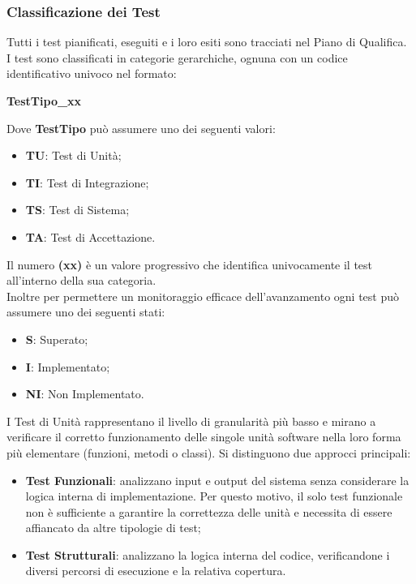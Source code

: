 \subsubsection{Classificazione dei Test}
Tutti i test pianificati, eseguiti e i loro esiti sono tracciati nel Piano di Qualifica.\\
I test sono classificati in categorie gerarchiche, ognuna con un codice identificativo univoco nel formato:
\begin{center}
    \textbf{TestTipo\_xx}
\end{center}
Dove \textbf{TestTipo} può assumere uno dei seguenti valori:
\begin{itemize}[itemsep=3pt, parsep=1pt, label=$\scriptstyle\bullet$]
    \item \textbf{TU}: Test di Unità;
    \item \textbf{TI}: Test di Integrazione;
    \item \textbf{TS}: Test di Sistema;
    \item \textbf{TA}: Test di Accettazione.
\end{itemize}
Il numero \textbf{(xx)} è un valore progressivo che identifica univocamente il test all'interno della sua categoria. \\
Inoltre per permettere un monitoraggio efficace dell'avanzamento ogni test può assumere uno dei seguenti stati:
\begin{itemize}[itemsep=3pt, parsep=1pt, label=$\scriptstyle\bullet$]
    \item \textbf{S}: Superato;
    \item \textbf{I}: Implementato;
    \item \textbf{NI}: Non Implementato.
\end{itemize}

I Test di Unità rappresentano il livello di granularità più basso e mirano a verificare il corretto funzionamento delle singole unità software nella loro forma più elementare (funzioni, metodi o classi).
Si distinguono due approcci principali:
\begin{itemize}
    \item \textbf{Test Funzionali}: analizzano input e output del sistema senza considerare la logica interna di implementazione. Per questo motivo, il solo test funzionale non è sufficiente a garantire la correttezza delle unità e necessita di essere affiancato da altre tipologie di test;
    \item \textbf{Test Strutturali}: analizzano la logica interna del codice, verificandone i diversi percorsi di esecuzione e la relativa copertura.
\end{itemize}

